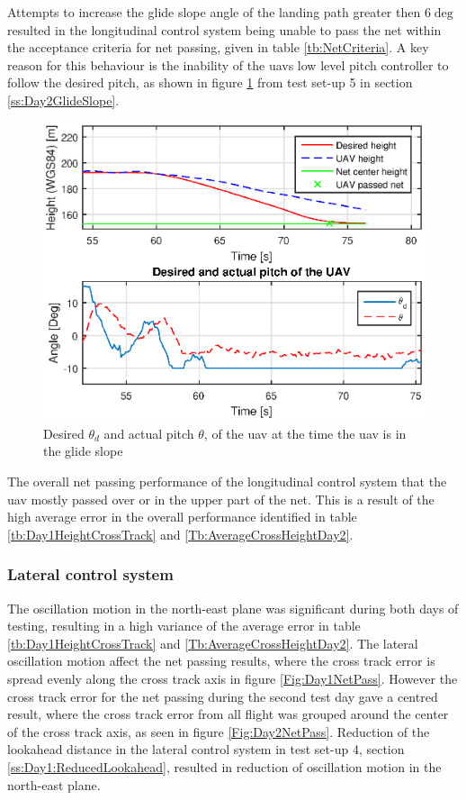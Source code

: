 Attempts to increase the glide slope angle of the landing path greater then $6 \deg$ resulted in the longitudinal control system being unable to pass the net within the acceptance criteria for net passing, given in table \ref{tb:NetCriteria}. A key reason for this behaviour is the inability of the \gls{uav}s low level pitch controller to follow the desired pitch, as shown in figure \ref{Fig:Pitch1juni081328} from test set-up 5 in section \ref{ss:Day2GlideSlope}. 
\begin{figure}[H]
\centering
\includegraphics[scale=0.7]{figs/Experiment/Pitch1juni081328.eps}
\caption{Desired $\theta_d$ and actual pitch $\theta$, of the \gls{uav} at the time the \gls{uav} is in the glide slope}
\label{Fig:Pitch1juni081328}
\end{figure}
The overall net passing performance of the longitudinal control system that the \gls{uav} mostly passed over or in the upper part of the net. This is a result of the high average error in the overall performance identified in table \ref{tb:Day1HeightCrossTrack} and \ref{Tb:AverageCrossHeightDay2}.

\subsubsection{Lateral control system}
The oscillation motion in the north-east plane was significant during both days of testing, resulting in a high variance of the average error in table \ref{tb:Day1HeightCrossTrack} and \ref{Tb:AverageCrossHeightDay2}. The lateral oscillation motion affect the net passing results, where the cross track error is spread evenly along the cross track axis in figure \ref{Fig:Day1NetPass}. However the cross track error for the net passing during the second test day gave a centred result, where the cross track error from all flight was grouped around the center of the cross track axis, as seen in figure \ref{Fig:Day2NetPass}. Reduction of the lookahead distance in the lateral control system in test set-up 4, section \ref{ss:Day1:ReducedLookahead}, resulted in reduction of oscillation motion in the north-east plane.

